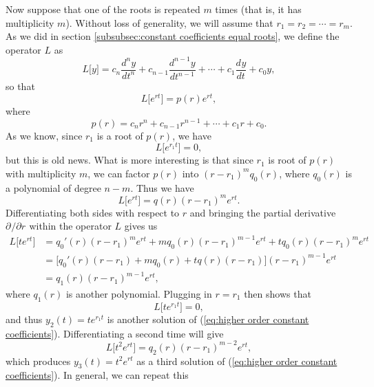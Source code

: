 \documentclass{myart}
\newcommand{\eq}[1]{(\ref{eq:#1})}
\newcommand{\deriv}[3][]{\frac{d^{#1}#2}{d#3^{#1}}}
\newcommand{\fpderiv}[3][]{\partial^{#1}#2/\partial#3^{#1}}
\begin{document}
Now suppose that one of the roots is repeated $m$ times (that is, it
has multiplicity $m$). Without loss of generality, we will assume that
$r_1 = r_2 = \cdots = r_m$. As we did in section
\ref{subsubsec:constant coefficients equal roots}, we define the
operator $L$ as
\begin{equation*}
    L\big[y\big]
  = c_n \deriv[n]{y}{t}
  + c_{n-1} \deriv[n-1]{y}{t}
  + \cdots
  + c_1 \deriv{y}{t}
  + c_0 y,
\end{equation*}
so that
\begin{equation*}
  L\big[e^{rt}\big] = p(r) e^{rt},
\end{equation*}
where
\begin{equation*}
  p(r) = c_n r^n + c_{n-1} r^{n-1} + \cdots + c_1 r + c_0.
\end{equation*}
As we know, since $r_1$ is a root of $p(r)$, we have
\begin{equation*}
  L\big[e^{r_1t}\big] = 0,
\end{equation*}
but this is old news. What is more interesting is that since $r_1$ is
root of $p(r)$ with multiplicity $m$, we can factor $p(r)$ into $(r -
r_1)^m q_0(r)$, where $q_0(r)$ is a polynomial of degree $n - m$. Thus
we have
\begin{equation*}
  L\big[e^{rt}\big] = q(r) (r - r_1)^m e^{rt}.
\end{equation*}
Differentiating both sides with respect to $r$ and bringing the
partial derivative $\fpderiv{}{r}$ within the operator $L$ gives us
\begin{align*}
     L\big[t e^{rt}\big]
  &=   q_0'(r)(r - r_1)^m e^{rt}
     + m q_0(r)(r - r_1)^{m-1} e^{rt}
     + t q_0(r)(r - r_1)^m e^{rt} \\
  &= \Big[
           q_0'(r)(r - r_1)
       + m q_0 (r)
       + t q   (r)(r - r_1)
      \Big](r - r_1)^{m-1} e^{rt} \\
  &= q_1(r)(r - r_1)^{m-1} e^{rt},
\end{align*}
where $q_1(r)$ is another polynomial. Plugging in $r = r_1$ then shows that
\begin{equation*}
  L\big[t e^{r_1t}\big] = 0,
\end{equation*}
and thus $y_2(t) = t e^{r_1t}$ is another solution of \eq{higher order
  constant coefficients}. Differentiating a second time will give
\begin{equation*}
  L\big[t^2 e^{rt}\big] = q_2(r)(r - r_1)^{m-2} e^{rt},
\end{equation*}
which produces $y_3(t) = t^2 e^{rt}$ as a third solution of \eq{higher
  order constant coefficients}. In general, we can repeat this
\end{document}
